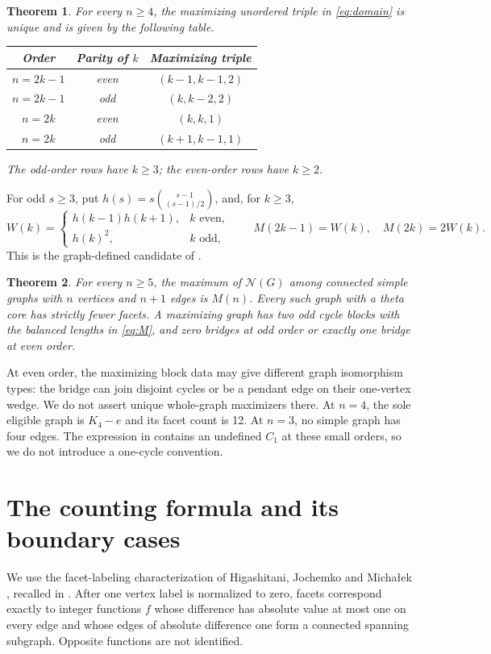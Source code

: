 \documentclass[11pt]{article}
\newtheorem{theorem}{Theorem}[section]
\theoremstyle{remark}
\newcommand{\N}{\mathcal N}
\begin{document}
\begin{theorem}\label{thm:theta}
For every $n\ge4$, the maximizing unordered triple in \eqref{eq:domain}
is unique and is given by the following table.
\begin{center}
\begin{tabular}{ccc}\toprule
Order & Parity of $k$ & Maximizing triple\\\midrule
$n=2k-1$ & even & $(k-1,k-1,2)$\\
$n=2k-1$ & odd & $(k,k-2,2)$\\
$n=2k$ & even & $(k,k,1)$\\
$n=2k$ & odd & $(k+1,k-1,1)$\\\bottomrule
\end{tabular}
\end{center}
The odd-order rows have $k\ge3$; the even-order rows have $k\ge2$.
\end{theorem}

For odd $s\ge3$, put $h(s)=s\binom{s-1}{(s-1)/2}$, and, for $k\ge3$,
\begin{equation}\label{eq:M}
 W(k)=\begin{cases}h(k-1)h(k+1),&k\text{ even},\\h(k)^2,&k\text{ odd},\end{cases}
 \qquad M(2k-1)=W(k),\quad M(2k)=2W(k).
\end{equation}
This is the graph-defined candidate of \cite[Definition 12]{BB}.

\begin{theorem}\label{thm:bicyclic}
For every $n\ge5$, the maximum of $\N(G)$ among connected simple graphs
with $n$ vertices and $n+1$ edges is $M(n)$. Every such graph with a theta
core has strictly fewer facets. A maximizing graph has two odd cycle
blocks with the balanced lengths in \eqref{eq:M}, and zero bridges at
odd order or exactly one bridge at even order.
\end{theorem}

At even order, the maximizing block data may give different graph
isomorphism types: the bridge can join disjoint cycles or be a pendant
edge on their one-vertex wedge. We do not assert unique whole-graph
maximizers there. At $n=4$, the sole eligible graph is $K_4-e$ and its
facet count is 12. At $n=3$, no simple graph has four edges. The expression
in \cite[Definition 12]{BB} contains an undefined $C_1$ at these small
orders, so we do not introduce a one-cycle convention.

\section{The counting formula and its boundary cases}
We use the facet-labeling characterization of Higashitani, Jochemko and
Micha\l ek \cite{HJM}, recalled in \cite[Theorem 5]{BB}. After one vertex
label is normalized to zero, facets correspond exactly to integer
functions $f$ whose difference has absolute value at most one on every
edge and whose edges of absolute difference one form a connected
spanning subgraph. Opposite functions are not identified.
\end{document}
